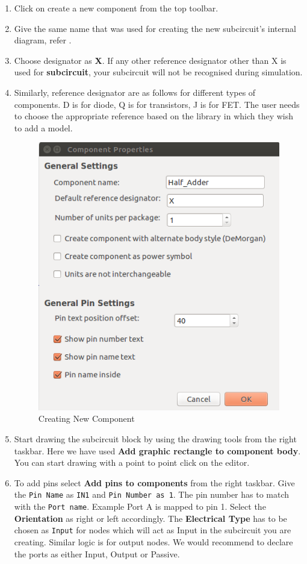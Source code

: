 \begin{itemize}
\begin{enumerate}
        \item Click on create a new component from the top toolbar.
        \item Give the same name that was used for creating the new subcircuit's internal diagram, refer .
        \item Choose designator as \textbf{X}. If any other reference designator other than X is used for \textbf{subcircuit}, your subcircuit will not be recognised during simulation.
        \item Similarly, reference designator are as follows for different types of components. D is for diode, Q is for transistors, J is for FET. The user needs to choose the appropriate reference based on the library in which they wish to add a model. 
            \begin{figure}[!htp]
                \centering         
                \includegraphics[width =\smfig]{subcktnewcomp.png}
                \caption{Creating New Component}
                \label{subcktnewcomp}
            \end{figure}

        \item Start drawing the subcircuit block by using the drawing tools from the right taskbar. Here we have used \textbf{Add graphic rectangle to component body}. You can start drawing with a point to point click on the editor.
        \item To add pins select {\textbf {Add pins to components}} from the right taskbar. Give the {\tt Pin Name} as {\tt {IN1}} and {\tt{Pin Number as 1}}. The pin number has to match with the {\tt Port name}. Example Port A is mapped to pin 1. Select the {\textbf{ Orientation}} as right or left accordingly. The {\textbf{ Electrical Type}} has to be chosen as {\tt Input} for nodes which will act as Input in the subcircuit you are creating. Similar logic is for output nodes. We would recommend to declare the ports as either Input, Output or Passive.
        

\end{enumerate}
\end{itemize}
